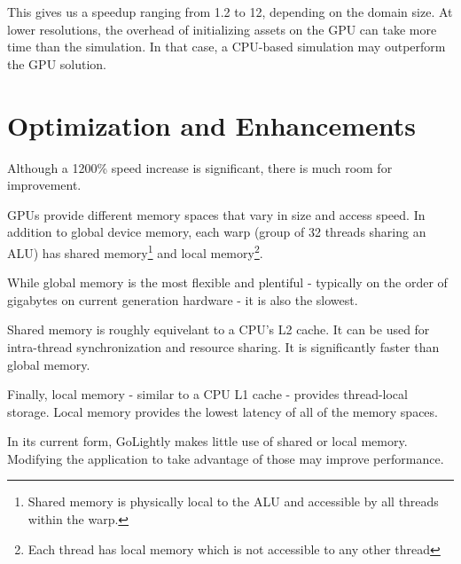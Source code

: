 This gives us a speedup ranging from 1.2 to 12, depending on the domain size. At lower resolutions, the overhead of initializing assets on the GPU can take more time than the simulation. In that case, a CPU-based simulation may outperform the GPU solution.

\section{Optimization and Enhancements}

Although a 1200\% speed increase is significant, there is much room for improvement. 

GPUs provide different memory spaces that vary in size and access speed. In addition to global device memory, each warp (group of 32 threads sharing an ALU) has shared memory\footnote{Shared memory is physically local to the ALU and accessible by all threads within the warp.} and local memory\footnote{Each thread has local memory which is not accessible to any other thread}.

While global memory is the most flexible and plentiful - typically on the order of gigabytes on current generation hardware - it is also the slowest. 

Shared memory is roughly equivelant to a CPU's L2 cache. It can be used for intra-thread synchronization and resource sharing. It is significantly faster than global memory.

Finally, local memory - similar to a CPU L1 cache - provides thread-local storage. Local memory provides the lowest latency of all of the memory spaces.

In its current form, GoLightly makes little use of shared or local memory. Modifying the application to take advantage of those may improve performance.







